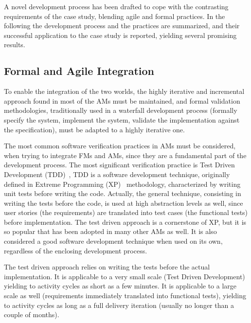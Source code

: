 \documentclass{article}
\begin{document}
A novel development process has been drafted to cope with the contrasting requirements of the case study, blending agile and formal practices.  
In the following the development process and the practices are summarized, and their successful application to the case study is reported, yielding several promising results.



\subsection{Formal and Agile Integration}
\label{subsec:formal_and_agile_integration}

To enable the integration of the two worlds, the highly iterative and incremental approach found in most of the AMs must be maintained, and formal validation methodologies, traditionally used in a waterfall development process (formally specify the system, implement the system, validate the implementation against the specification), must be adapted to a highly iterative one.

The most common software verification practices in AMs must be considered, when trying to integrate FMs and AMs, since they are a fundamental part of the development process. 
The most significant verification practice is Test Driven Development (TDD)~\cite{Beck2003}, TDD is a software development technique, originally defined in Extreme Programming (XP)~\cite{Beck2004} methodology, characterized by writing unit tests before writing the code.
Actually, the general technique, consisting in writing the tests before the code, is used at high abstraction levels as well, since user stories (the requirements) are translated into test cases (the functional tests) before implementation.
The test driven approach is a cornerstone of XP, but it is so popular that has been adopted in many other AMs as well.
It is also considered a good software development technique when used on its own, regardless of the enclosing development process.

The test driven approach relies on writing the tests before the actual implementation. 
It is applicable to a very small scale (Test Driven Development) yielding to activity cycles as short as a few minutes.
It is applicable to a large scale as well (requirements immediately translated into functional tests), yielding to activity cycles as long as a full delivery iteration (usually no longer than a couple of months).
\end{document}
